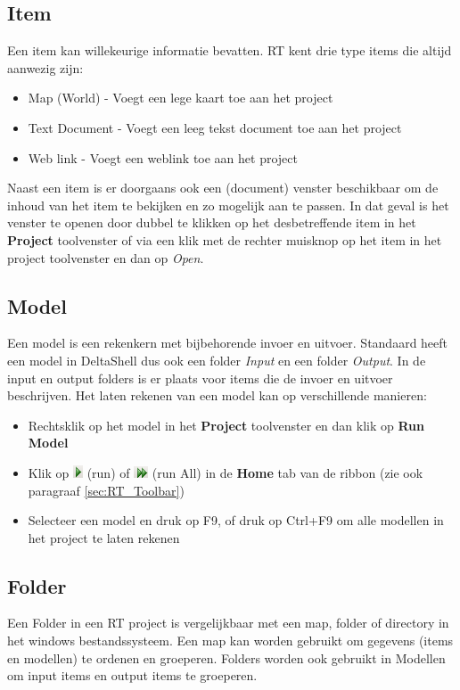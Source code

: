 \subsection{Item}
Een item kan willekeurige informatie bevatten. RT kent drie type items die altijd aanwezig zijn:
\begin{itemize}
\item Map (World) - Voegt een lege kaart toe aan het project
\item Text Document - Voegt een leeg tekst document toe aan het project
\item Web link - Voegt een weblink toe aan het project
\end{itemize}
Naast een item is er doorgaans ook een (document) venster beschikbaar om de inhoud van het item te bekijken en zo mogelijk aan te passen. In dat geval is het venster te openen door dubbel te klikken op het desbetreffende item in het \textbf{Project} toolvenster of via een klik met de rechter muisknop op het item in het project toolvenster en dan op \textit{Open}.

\subsection{Model}
Een model is een rekenkern met bijbehorende invoer en uitvoer. Standaard heeft een model in DeltaShell dus ook een folder \textit{Input} en een folder \textit{Output}. In de input en output folders is er plaats voor items die de invoer en uitvoer beschrijven. Het laten rekenen van een model kan op verschillende manieren:
\begin{itemize}
\item Rechtsklik op het model in het \textbf{Project} toolvenster en dan klik op \textbf{Run Model}
\item Klik op \includegraphics{figures/chapter_general/Run_Arrow.png} (run) of \includegraphics{figures/chapter_general/RunAll_Arrow.png} (run All) in de \textbf{Home} tab van de ribbon (zie ook paragraaf \ref{sec:RT_Toolbar})
\item Selecteer een model en druk op F9, of druk op Ctrl+F9 om alle modellen in het project te laten rekenen
\end{itemize}

\subsection{Folder}
Een Folder in een RT project is vergelijkbaar met een map, folder of directory in het windows bestandssysteem. Een map kan worden gebruikt om gegevens (items en modellen) te ordenen en groeperen. Folders worden ook gebruikt in Modellen om input items en output items te groeperen.

